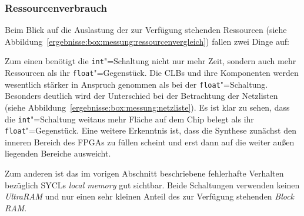 \subsubsection{Ressourcenverbrauch}

Beim Blick auf die Auslastung der zur Verfügung stehenden Ressourcen (siehe
Abbildung~\ref{ergebnisse:box:messung:ressourcenvergleich}) fallen zwei Dinge
auf:

Zum einen benötigt die \texttt{int}"=Schaltung nicht nur mehr Zeit, sondern auch
mehr Ressourcen als ihr \texttt{float}"=Gegenstück. Die CLBs und ihre
Komponenten werden wesentlich stärker in Anspruch genommen als bei der
\texttt{float}"=Schaltung. Besonders deutlich wird der Unterschied bei der
Betrachtung der Netzlisten (siehe
Abbildung~\ref{ergebnisse:box:messung:netzliste}). Es ist klar zu sehen, dass
die \texttt{int}"=Schaltung weitaus mehr Fläche auf dem Chip belegt als ihr
\texttt{float}"=Gegenstück. Eine weitere Erkenntnis ist, dass die Synthese
zunächst den inneren Bereich des FPGAs zu füllen scheint und erst dann auf die
weiter außen liegenden Bereiche ausweicht.

Zum anderen ist das im vorigen Abschnitt beschriebene fehlerhafte Verhalten
bezüglich SYCLs \textit{local memory} gut sichtbar. Beide Schaltungen verwenden
keinen \textit{UltraRAM} und nur einen sehr kleinen Anteil des zur Verfügung
stehenden \textit{Block RAM}.

